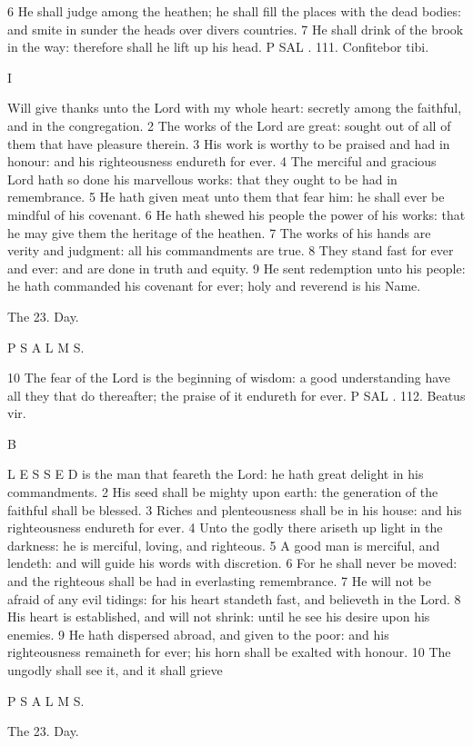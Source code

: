 6 He shall judge among the heathen; he shall fill the places with the dead bodies: and smite in sunder the heads over divers countries. 7 He shall drink of the brook in the way: therefore shall he lift up his head. P SAL . 111. Confitebor tibi.

I

Will give thanks unto the Lord with my whole heart: secretly among the faithful, and in the congregation. 2 The works of the Lord are great: sought out of all of them that have pleasure therein. 3 His work is worthy to be praised and had in honour: and his righteousness endureth for ever. 4 The merciful and gracious Lord hath so done his marvellous works: that they ought to be had in remembrance. 5 He hath given meat unto them that fear him: he shall ever be mindful of his covenant. 6 He hath shewed his people the power of his works: that he may give them the heritage of the heathen. 7 The works of his hands are verity and judgment: all his commandments are true. 8 They stand fast for ever and ever: and are done in truth and equity. 9 He sent redemption unto his people: he hath commanded his covenant for ever; holy and reverend is his Name.

The 23. Day.

P S A L M S.

10 The fear of the Lord is the beginning of wisdom: a good understanding have all they that do thereafter; the praise of it endureth for ever. P SAL . 112. Beatus vir.

B

L E S S E D is the man that feareth the Lord: he hath great delight in his commandments. 2 His seed shall be mighty upon earth: the generation of the faithful shall be blessed. 3 Riches and plenteousness shall be in his house: and his righteousness endureth for ever. 4 Unto the godly there ariseth up light in the darkness: he is merciful, loving, and righteous. 5 A good man is merciful, and lendeth: and will guide his words with discretion. 6 For he shall never be moved: and the righteous shall be had in everlasting remembrance. 7 He will not be afraid of any evil tidings: for his heart standeth fast, and believeth in the Lord. 8 His heart is established, and will not shrink: until he see his desire upon his enemies. 9 He hath dispersed abroad, and given to the poor: and his righteousness remaineth for ever; his horn shall be exalted with honour. 10 The ungodly shall see it, and it shall grieve

P S A L M S.

The 23. Day.

